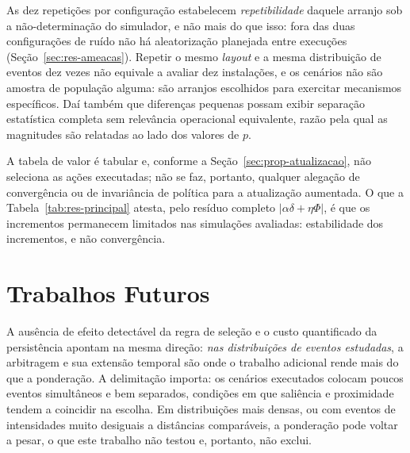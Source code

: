 As dez repetições por configuração estabelecem \emph{repetibilidade} daquele arranjo
sob a não-determinação do simulador, e não mais do que isso: fora das duas
configurações de ruído não há aleatorização planejada entre execuções
(Seção~\ref{sec:res-ameacas}). Repetir o mesmo \textit{layout} e a mesma distribuição
de eventos dez vezes não equivale a avaliar dez instalações, e os cenários não são
amostra de população alguma: são arranjos escolhidos para exercitar mecanismos
específicos. Daí também que diferenças pequenas possam exibir separação estatística
completa sem relevância operacional equivalente, razão pela qual as magnitudes são
relatadas ao lado dos valores de $p$.

A tabela de valor é tabular e, conforme a Seção~\ref{sec:prop-atualizacao}, não
seleciona as ações executadas; não se faz, portanto, qualquer alegação de
convergência ou de invariância de política para a atualização aumentada. O que a
Tabela~\ref{tab:res-principal} atesta, pelo resíduo completo
$|\alpha\delta+\eta\Phi|$, é que os incrementos permanecem limitados nas simulações
avaliadas: estabilidade dos incrementos, e não convergência.

\section{Trabalhos Futuros}
\label{sec:conc-futuro}

A ausência de efeito detectável da regra de seleção e o custo quantificado da
persistência apontam na mesma direção: \emph{nas distribuições de eventos estudadas},
a arbitragem e sua extensão temporal são onde o trabalho adicional rende mais do que a
ponderação. A delimitação importa: os cenários executados colocam poucos eventos
simultâneos e bem separados, condições em que saliência e proximidade tendem a
coincidir na escolha. Em distribuições mais densas, ou com eventos de intensidades
muito desiguais a distâncias comparáveis, a ponderação pode voltar a pesar, o que
este trabalho não testou e, portanto, não exclui.

